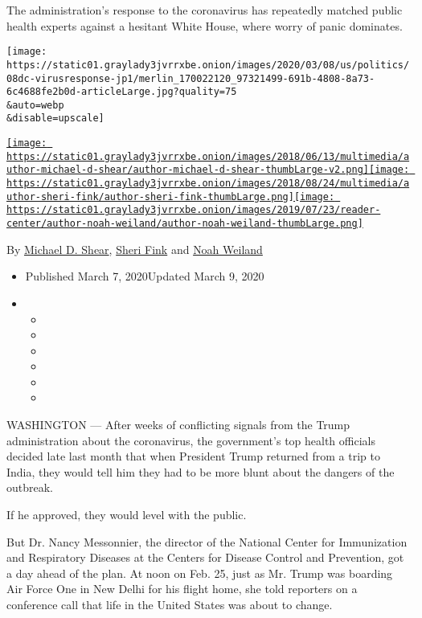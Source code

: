 The administration's response to the coronavirus has repeatedly matched
public health experts against a hesitant White House, where worry of
panic dominates.

\texttt{[image: https://static01.graylady3jvrrxbe.onion/images/2020/03/08/us/politics/08dc-virusresponse-jp1/merlin\_170022120\_97321499-691b-4808-8a73-6c4688fe2b0d-articleLarge.jpg?quality=75\\\&auto=webp\\\&disable=upscale]}

\href{https://www.nytimes3xbfgragh.onion/by/michael-d-shear}{\texttt{[image: https://static01.graylady3jvrrxbe.onion/images/2018/06/13/multimedia/author-michael-d-shear/author-michael-d-shear-thumbLarge-v2.png]}}\href{https://www.nytimes3xbfgragh.onion/by/sheri-fink}{\texttt{[image: https://static01.graylady3jvrrxbe.onion/images/2018/08/24/multimedia/author-sheri-fink/author-sheri-fink-thumbLarge.png]}}\href{https://www.nytimes3xbfgragh.onion/by/noah-weiland}{\texttt{[image: https://static01.graylady3jvrrxbe.onion/images/2019/07/23/reader-center/author-noah-weiland/author-noah-weiland-thumbLarge.png]}}

By \href{https://www.nytimes3xbfgragh.onion/by/michael-d-shear}{Michael
D. Shear}, \href{https://www.nytimes3xbfgragh.onion/by/sheri-fink}{Sheri
Fink} and \href{https://www.nytimes3xbfgragh.onion/by/noah-weiland}{Noah
Weiland}

\begin{itemize}
\item
  Published March 7, 2020Updated March 9, 2020
\item
  \begin{itemize}
  \item
  \item
  \item
  \item
  \item
  \item
  \end{itemize}
\end{itemize}

WASHINGTON --- After weeks of conflicting signals from the Trump
administration about the coronavirus, the government's top health
officials decided late last month that when President Trump returned
from a trip to India, they would tell him they had to be more blunt
about the dangers of the outbreak.

If he approved, they would level with the public.

But Dr. Nancy Messonnier, the director of the National Center for
Immunization and Respiratory Diseases at the Centers for Disease Control
and Prevention, got a day ahead of the plan. At noon on Feb. 25, just as
Mr. Trump was boarding Air Force One in New Delhi for his flight home,
she told reporters on a conference call that life in the United States
was about to change.


